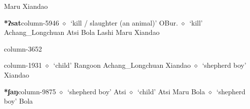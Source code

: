 \hspace{1ex}
         Maru 
\hspace{1ex}
         Xiandao 
  \item {\footnotesize \textbf{*ʔsat}}{\tiny column-5946}
         $\diamond$~`kill / slaughter (an animal)'
         OBur. 
\hspace{1ex}
         $\diamond$~`kill'
         Achang\_Longchuan 
\hspace{1ex}
         Atsi 
\hspace{1ex}
         Bola 
\hspace{1ex}
         Lashi 
\hspace{1ex}
         Maru 
\hspace{1ex}
         Xiandao 
  \item {\footnotesize \textbf{}}{\tiny column-3652}
  \item {\footnotesize \textbf{}}{\tiny column-1931}
         $\diamond$~`child'
         Rangoon 
\hspace{1ex}
         Achang\_Longchuan 
\hspace{1ex}
         Xiandao 
\hspace{1ex}
         $\diamond$~`shepherd boy'
         Xiandao 
  \item {\footnotesize \textbf{*ʃaŋ}}{\tiny column-9875}
         $\diamond$~`shepherd boy'
         Atsi 
\hspace{1ex}
         $\diamond$~`child'
         Atsi 
\hspace{1ex}
         Maru 
\hspace{1ex}
         Bola 
\hspace{1ex}
         $\diamond$~`shepherd boy'
         Bola 
\hspace{1ex}
